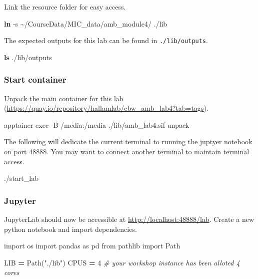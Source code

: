 \documentclass[
]{book}
\newenvironment{Shaded}{\begin{snugshade}}{\end{snugshade}}
\newcommand{\AttributeTok}[1]{\textcolor[rgb]{0.13,0.29,0.53}{#1}}
\newcommand{\CommentTok}[1]{\textcolor[rgb]{0.56,0.35,0.01}{\textit{#1}}}
\newcommand{\DecValTok}[1]{\textcolor[rgb]{0.00,0.00,0.81}{#1}}
\newcommand{\ExtensionTok}[1]{#1}
\newcommand{\FunctionTok}[1]{\textcolor[rgb]{0.13,0.29,0.53}{\textbf{#1}}}
\newcommand{\ImportTok}[1]{#1}
\newcommand{\NormalTok}[1]{#1}
\newcommand{\OperatorTok}[1]{\textcolor[rgb]{0.81,0.36,0.00}{\textbf{#1}}}
\newcommand{\StringTok}[1]{\textcolor[rgb]{0.31,0.60,0.02}{#1}}
\begin{document}
Link the resource folder for easy access.

\begin{Shaded}
\begin{Highlighting}[]
\FunctionTok{ln} \AttributeTok{{-}s}\NormalTok{ \textasciitilde{}/CourseData/MIC\_data/amb\_module4/ ./lib}
\end{Highlighting}
\end{Shaded}

The expected outputs for this lab can be found in \texttt{./lib/outputs}.

\begin{Shaded}
\begin{Highlighting}[]
\FunctionTok{ls}\NormalTok{ ./lib/outputs}
\end{Highlighting}
\end{Shaded}

\subsubsection{Start container}\label{start-container-1}

Unpack the main container for this lab (\url{https://quay.io/repository/hallamlab/cbw_amb_lab4?tab=tags}).

\begin{Shaded}
\begin{Highlighting}[]
\ExtensionTok{apptainer}\NormalTok{ exec }\AttributeTok{{-}B}\NormalTok{ /media:/media ./lib/amb\_lab4.sif unpack}
\end{Highlighting}
\end{Shaded}

The following will dedicate the current terminal to running the juptyer notebook on port 48888.
You may want to connect another terminal to maintain terminal access.

\begin{Shaded}
\begin{Highlighting}[]
\ExtensionTok{./start\_lab}
\end{Highlighting}
\end{Shaded}

\subsubsection{Jupyter}\label{jupyter-1}

JupyterLab should now be accessible at \url{http://localhost:48888/lab}. Create a new python notebook and import dependencies.

\begin{Shaded}
\begin{Highlighting}[numbers=left,,]
\ImportTok{import}\NormalTok{ os}
\ImportTok{import}\NormalTok{ pandas }\ImportTok{as}\NormalTok{ pd}
\ImportTok{from}\NormalTok{ pathlib }\ImportTok{import}\NormalTok{ Path}

\NormalTok{LIB }\OperatorTok{=}\NormalTok{ Path(}\StringTok{"./lib"}\NormalTok{)}
\NormalTok{CPUS }\OperatorTok{=} \DecValTok{4} \CommentTok{\# your workshop instance has been alloted 4 cores}
\end{Highlighting}
\end{Shaded}
\end{document}
